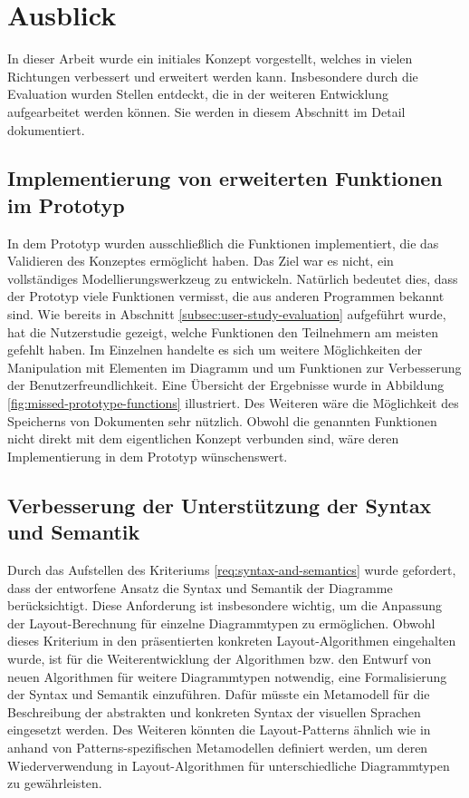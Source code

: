 \section{Ausblick}
\label{sec:outlook}

In dieser Arbeit wurde ein initiales Konzept vorgestellt, welches in vielen Richtungen verbessert und erweitert werden kann. Insbesondere durch die Evaluation wurden Stellen entdeckt, die in der weiteren Entwicklung aufgearbeitet werden können. Sie werden in diesem Abschnitt im Detail dokumentiert.

\subsection{Implementierung von erweiterten Funktionen im Prototyp}

In dem Prototyp wurden ausschließlich die Funktionen implementiert, die das Validieren des Konzeptes ermöglicht haben. Das Ziel war es nicht, ein vollständiges Modellierungswerkzeug zu entwickeln. Natürlich bedeutet dies, dass der Prototyp viele Funktionen vermisst, die aus anderen Programmen bekannt sind. Wie bereits in Abschnitt \ref{subsec:user-study-evaluation} aufgeführt wurde, hat die Nutzerstudie gezeigt, welche Funktionen den Teilnehmern am meisten gefehlt haben. Im Einzelnen handelte es sich um weitere Möglichkeiten der Manipulation mit Elementen im Diagramm und um Funktionen zur Verbesserung der Benutzerfreundlichkeit. Eine Übersicht der Ergebnisse wurde in Abbildung \ref{fig:missed-prototype-functions} illustriert. Des Weiteren wäre die Möglichkeit des Speicherns von Dokumenten sehr nützlich. Obwohl die genannten Funktionen nicht direkt mit dem eigentlichen Konzept verbunden sind, wäre deren Implementierung in dem Prototyp wünschenswert.

\subsection{Verbesserung der Unterstützung der Syntax und Semantik}

Durch das Aufstellen des Kriteriums \ref{req:syntax-and-semantics} wurde gefordert, dass der entworfene Ansatz die Syntax und Semantik der Diagramme berücksichtigt. Diese Anforderung ist insbesondere wichtig, um die Anpassung der Layout-Berechnung für einzelne Diagrammtypen zu ermöglichen. Obwohl dieses Kriterium in den präsentierten konkreten Layout-Algorithmen eingehalten wurde, ist für die Weiterentwicklung der Algorithmen bzw. den Entwurf von neuen Algorithmen für weitere Diagrammtypen notwendig, eine Formalisierung der Syntax und Semantik einzuführen. Dafür müsste ein Metamodell für die Beschreibung der abstrakten und konkreten Syntax der visuellen Sprachen eingesetzt werden. Des Weiteren könnten die Layout-Patterns ähnlich wie in \cite{Maier12A-Pattern-based} anhand von Patterns-spezifischen Metamodellen definiert werden, um deren Wiederverwendung in Layout-Algorithmen für unterschiedliche Diagrammtypen zu gewährleisten.


